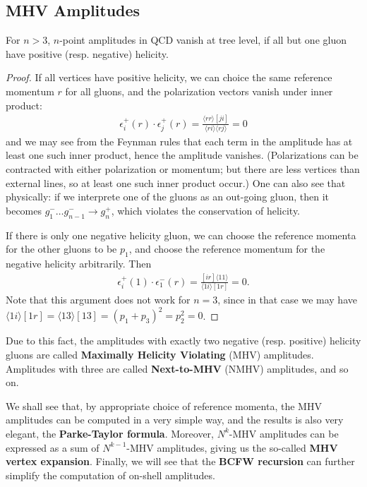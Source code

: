 \subsection{MHV Amplitudes}
\label{sec:mhv-amplitudes}

\begin{theorem}
    For $n > 3$, $n$-point amplitudes in QCD vanish at tree level, if all but one gluon have positive (resp. negative) helicity.
\end{theorem}
\begin{proof}
    If all vertices have positive helicity, we can choice the same reference momentum $r$ for all gluons, and the polarization vectors vanish under inner product:
    \begin{align}
\epsilon_i^{+}(r) \cdot \epsilon_j^{+}(r)=\frac{\langle r r\rangle[j i]}{\langle r i\rangle\langle r j\rangle}=0
\end{align}
    and we may see from the Feynman rules that each term in the amplitude has at least one such inner product, hence the amplitude vanishes. (Polarizations can be contracted with either polarization or momentum; but there are less vertices than external lines, so at least one such inner product occur.) One can also see that physically: if we interprete one of the gluons as an out-going gluon, then it becomes $g_1^- \ldots g_{n-1}^- \to g_n^+$, which violates the conservation of helicity.

    If there is only one negative helicity gluon, we can choose the reference momenta for the other gluons to be $p_1$, and choose the reference momentum for the negative helicity arbitrarily. Then
    \begin{align}
\epsilon_i^{+}(1) \cdot \epsilon_1^{-}(r)=\frac{[i r]\langle 11\rangle}{\langle 1 i\rangle[1 r]}=0.
\end{align}
Note that this argument does not work for $n=3$, since in that case we may have $\langle 1 i\rangle[1 r] =\langle 1 3\rangle[1 3] = (p_1 + p_3)^2 = p_2^2 = 0$.

\end{proof}

Due to this fact, the amplitudes with exactly two negative (resp. positive) helicity gluons are called \textbf{Maximally Helicity Violating} (MHV) amplitudes. Amplitudes with three are called \textbf{Next-to-MHV} (NMHV) amplitudes, and so on.

We shall see that, by appropriate choice of reference momenta, the MHV amplitudes can be computed in a very simple way, and the results is also very elegant, the \textbf{Parke-Taylor formula}. Moreover, $N^k$-MHV amplitudes can be expressed as a sum of $N^{k-1}$-MHV amplitudes, giving us the so-called \textbf{MHV vertex expansion}. Finally, we will see that the \textbf{BCFW recursion} can further simplify the computation of on-shell amplitudes.


